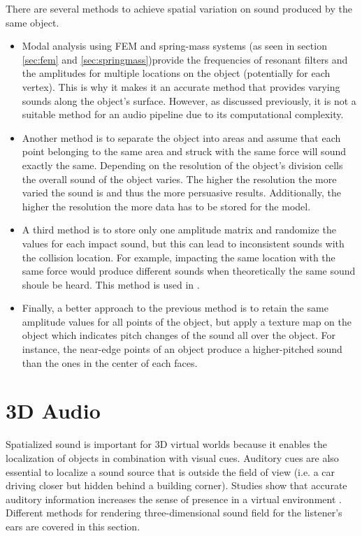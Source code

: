 There are several methods to achieve spatial variation on sound produced by the same object. 
\begin{itemize}
\item Modal analysis using \gls{FEM} and spring-mass systems (as seen in section \ref{sec:fem} and \ref{sec:springmass})provide the frequencies of resonant filters and the amplitudes for multiple locations on the object (potentially for each vertex). This is why it makes it an accurate method that provides varying sounds along the object's surface. However, as discussed previously, it is not a suitable method for an audio pipeline due to its computational complexity.

\item Another method is to separate the object into areas and assume that each point belonging to the same area and struck with the same force will sound exactly the same. Depending on the resolution of the object's division cells the overall sound of the object varies. The higher the resolution the more varied the sound is and thus the more persuasive results. Additionally, the higher the resolution the more data has to be stored for the model.

\item A third method is to store only one amplitude matrix and randomize the values for each impact sound, but this can lead to  inconsistent sounds with the collision location. For example, impacting the same location with the same force would produce different sounds when theoretically the same sound shoule be heard. This method is used in \cite{lloyd2011sound}.

\item Finally, a better approach to the previous method is to retain the same amplitude values for all points of the object, but apply a texture map on the object which indicates pitch changes of the sound all over the object. For instance, the near-edge points of an object produce a higher-pitched sound than the ones in the center of each faces. 

\end{itemize}

\section{3D Audio}

Spatialized sound is important for 3D virtual worlds because it enables the localization of objects in combination with visual cues. Auditory cues are also essential to localize a sound source that is outside the field of view (i.e. a car driving closer but hidden behind a building corner). Studies show that accurate auditory information increases the sense of presence in a virtual environment \cite{larsson2002better}. Different methods for rendering three-dimensional sound field for the listener's ears are covered in this section.

